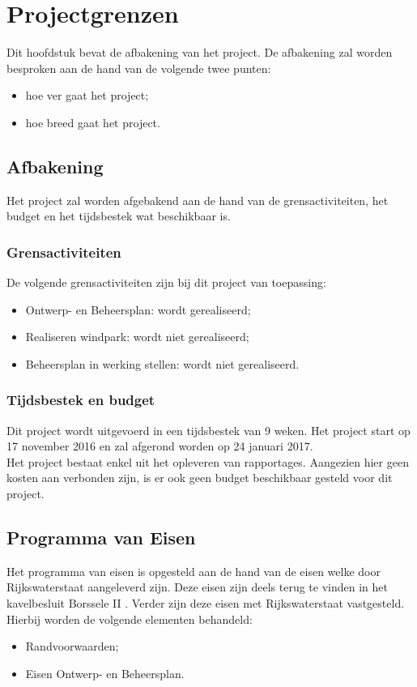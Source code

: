 \documentclass[numbers=endperiod]{scrartcl}
\newcommand{\sectionSmall}[1]{
	\vspace{-10pt}
	\section{#1}
	\vspace{-5pt}
}
\newcommand{\whitespace}{\vspace*{2 mm} \\}%
\begin{document}
	\sectionSmall{Projectgrenzen}
	Dit hoofdstuk bevat de afbakening van het project. De afbakening zal worden besproken aan de hand van de volgende twee punten:
	\begin{itemize}[noitemsep]
		\item hoe ver gaat het project;
		\item hoe breed gaat het project.
	\end{itemize}
	\subsection{Afbakening}
	Het project zal worden afgebakend aan de hand van de grensactiviteiten, het budget en het tijdsbestek wat beschikbaar is.
	\subsubsection{Grensactiviteiten}
	De volgende grensactiviteiten zijn bij dit project van toepassing:
	\begin{itemize}
		\item Ontwerp- en Beheersplan: wordt gerealiseerd;
		\item Realiseren windpark: wordt niet gerealiseerd;
		\item Beheersplan in werking stellen: wordt niet gerealiseerd.
	\end{itemize}
	\subsubsection{Tijdsbestek en budget}
	Dit project wordt uitgevoerd in een tijdsbestek van 9 weken. Het project start op 17 november 2016 en zal afgerond worden op 24 januari 2017.
	\whitespace
	Het project bestaat enkel uit het opleveren van rapportages. Aangezien hier geen kosten aan verbonden zijn, is er ook geen budget beschikbaar gesteld voor dit project.
	\subsection{Programma van Eisen}
	Het programma van eisen is opgesteld aan de hand van de eisen welke door Rijkswaterstaat aangeleverd zijn. Deze eisen zijn deels terug te vinden in het kavelbesluit Borssele II \cite{Kavelbesluit:2015:Online}. Verder zijn deze eisen met Rijkswaterstaat vastgesteld.
	\whitespace
	Hierbij worden de volgende elementen behandeld:
	\begin{itemize}[noitemsep]
		\item Randvoorwaarden;
		\item Eisen Ontwerp- en Beheersplan.
	\end{itemize}
\end{document}
